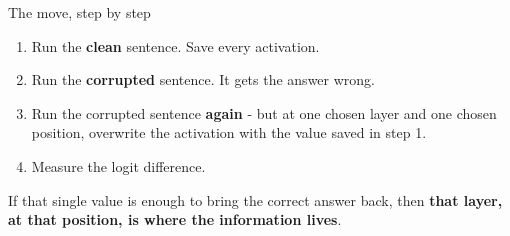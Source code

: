 \documentclass[aspectratio=169]{beamer}
\newcommand{\keybox}[1]{%
  \begin{tcolorbox}[colback=armblue!8, colframe=armblue, boxrule=0.6pt, arc=2pt]
  #1
  \end{tcolorbox}}
\begin{document}
\begin{frame}{The move, step by step}
  \vspace{0.5em}
  \begin{enumerate}
    \item Run the \textbf{clean} sentence. Save every activation.
    \item Run the \textbf{corrupted} sentence. It gets the answer wrong.
    \item Run the corrupted sentence \textbf{again} - but at one chosen layer and one chosen
      position, overwrite the activation with the value saved in step 1.
    \item Measure the logit difference.
  \end{enumerate}

  \vspace{1.0em}
  \begin{center}
  \end{center}

  \vspace{0.7em}
  \keybox{If that single value is enough to bring the correct answer back, then \textbf{that
  layer, at that position, is where the information lives}.}
\end{frame}
\end{document}
